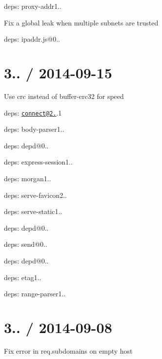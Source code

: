 {\ttfamily 
\begin{DoxyItemize}
\item deps\+: proxy-\/addr1..
\begin{DoxyItemize}
\item Fix a global leak when multiple subnets are trusted
\item deps\+: ipaddr.\+js@0..
\end{DoxyItemize}
\end{DoxyItemize}}

{\ttfamily \section*{3.. / 2014-\/09-\/15 }}

{\ttfamily }

{\ttfamily 
\begin{DoxyItemize}
\item Use {\ttfamily crc} instead of {\ttfamily buffer-\/crc32} for speed
\item deps\+: \href{mailto:connect@2.26}{\tt connect@2.}.1
\begin{DoxyItemize}
\item deps\+: body-\/parser1..
\item deps\+: depd@0..
\item deps\+: express-\/session1..
\item deps\+: morgan1..
\item deps\+: serve-\/favicon2..
\item deps\+: serve-\/static1..
\end{DoxyItemize}
\item deps\+: depd@0..
\item deps\+: send@0..
\begin{DoxyItemize}
\item deps\+: depd@0..
\item deps\+: etag1..
\item deps\+: range-\/parser1..
\end{DoxyItemize}
\end{DoxyItemize}}

{\ttfamily \section*{3.. / 2014-\/09-\/08 }}

{\ttfamily }

{\ttfamily 
\begin{DoxyItemize}
\item Fix error in {\ttfamily req.\+subdomains} on empty host
\end{DoxyItemize}}

